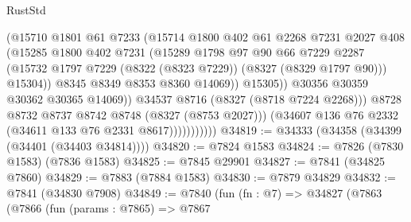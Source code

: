 \begin{lexlean}{RustStd}
\begin{coremodule}
                                  (@15710
                                    @1801
                                    @61
                                    @7233
                                    (@15714
                                      @1800
                                      @402
                                      @61
                                      @2268
                                      @7231
                                      @2027
                                      @408
                                      (@15285
                                        @1800
                                        @402
                                        @7231
                                        (@15289
                                          @1798
                                          @97
                                          @90
                                          @66
                                          @7229
                                          @2287
                                          (@15732
                                            @1797
                                            @7229
                                            (@8322 (@8323 @7229))
                                            (@8327 (@8329 @1797 @90)))
                                          @15304))
                                      @8345
                                      @8349
                                      @8353
                                      @8360
                                      @14069))
                                  @15305))
                              @30356
                              @30359
                              @30362
                              @30365
                              @14069))
                          @34537
                          @8716
                          (@8327 (@8718 @7224 @2268)))
                        @8728
                        @8732
                        @8737
                        @8742
                        @8748
                        (@8327 (@8753 @2027)))
                      (@34607 @136 @76 @2332 (@34611 @133 @76 @2331 @8617)))))))))))
@34819 := @34333 (@34358 (@34399 (@34401 (@34403 @34814))))
@34820 := @7824 @1583
@34824 := @7826 (@7830 @1583) (@7836 @1583)
@34825 := @7845 @29901
@34827 := @7841 (@34825 @7860)
@34829 := @7883 (@7884 @1583)
@34830 := @7879 @34829
@34832 := @7841 (@34830 @7908)
@34849 := @7840
    (fun (fn : @7) =>
    @34827
      (@7863
        (@7866
          (fun (params : @7865) =>
          @7867

\end{coremodule}
\end{lexlean}
